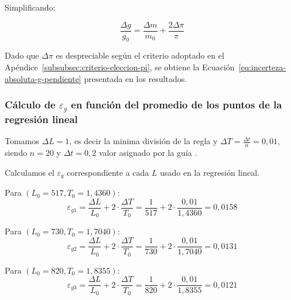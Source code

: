 Simplificando:

\begin{equation}
    \frac{\Delta g}{g_0} = \frac{\Delta m}{m_0} + \frac{2\Delta \pi}{\pi}
    \label{eq:incerteza-relativa-simplificada-gravedad}
\end{equation}

Dado que $\Delta \pi$ es despreciable según el criterio adoptado en el Apéndice~\ref{subsubsec:criterio-eleccion-pi}, se obtiene la Ecuación~\eqref{eq:incerteza-absoluta-g-pendiente} presentada en los resultados.


\clearpage
\subsubsection{Cálculo de $\varepsilon_g$ en función del promedio de los puntos de la regresión lineal}
\label{subsubsec:calculo-error-relativo-g-promedio-regresion}

Tomamos $\Delta L = 1$, es decir la minima división de la regla y $\Delta T = \frac{\Delta t}{n} = 0{,}01$, siendo $n=20$ y $\Delta t = 0{,}2$ valor asignado por la guía \cite{catedra2007pendulo}.

Calculamos el $\varepsilon_g$ correspondiente a cada $L$ usado en la regresión lineal.

Para $(L_0=517,T_0=1{,}4360)$:
\begin{equation}
    \varepsilon_{g1} = \frac{\Delta L}{L_0} + 2 \cdot \frac{\Delta T}{T_0} = \frac{1}{517} + 2 \cdot \frac{0{,}01}{1{,}4360} = 0{,}0158
    \label{eq:error-relativo-periodo-pendulo-angulos-pequennos-resolucion-1}
\end{equation}

Para $(L_0=730,T_0=1{,}7040)$:
\begin{equation}
    \varepsilon_{g2} = \frac{\Delta L}{L_0} + 2 \cdot \frac{\Delta T}{T_0} = \frac{1}{730} + 2 \cdot \frac{0{,}01}{1{,}7040} = 0{,}0131
    \label{eq:error-relativo-periodo-pendulo-angulos-pequennos-resolucion-2}
\end{equation}

Para $(L_0=820,T_0=1{,}8355)$:
\begin{equation}
    \varepsilon_{g3} = \frac{\Delta L}{L_0} + 2 \cdot \frac{\Delta T}{T_0} = \frac{1}{820} + 2 \cdot \frac{0{,}01}{1{,}8355} = 0{,}0121
    \label{eq:error-relativo-periodo-pendulo-angulos-pequennos-resolucion-3}
\end{equation}

